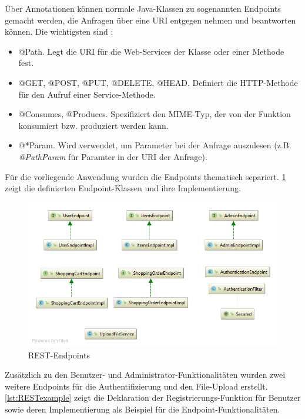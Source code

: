 Über Annotationen können normale Java-Klassen zu sogenannten Endpoints gemacht werden, die Anfragen über eine \acs{URI} entgegen nehmen und beantworten können.
Die wichtigsten sind \cite{Jersey2017a}:

\begin{itemize}
\item{@Path.} Legt die \acs{URI} für die Web-Services der Klasse oder einer Methode fest.
\item{@GET, @POST, @PUT, @DELETE, @HEAD.} Definiert die \acs{HTTP}-Methode für den Aufruf einer Service-Methode.
\item{@Consumes, @Produces.} Spezifiziert den \acs{MIME}-Typ, der von der Funktion konsumiert bzw. produziert werden kann.
\item{@*Param.} Wird verwendet, um Parameter bei der Anfrage auszulesen (z.B. \textit{@PathParam} für Paramter in der \acs{URI} der Anfrage).
\end{itemize}

Für die vorliegende Anwendung wurden die Endpoints thematisch separiert.
\cref{fig:endpoints} zeigt die definierten Endpoint-Klassen und ihre Implementierung.

\begin{figure}[th!]
	\centering
	\includegraphics[width=0.75\linewidth]{bilder/kap7/api_diagram}
	\caption{REST-Endpoints}
	\label{fig:endpoints}
\end{figure}

Zusätzlich zu den Benutzer- und Administrator-Funktionalitäten wurden zwei weitere Endpoints für die Authentifizierung und den File-Upload erstellt.
\\


\cref{lst:RESTexample} zeigt die Deklaration der Registrierungs-Funktion für Benutzer sowie deren Implementierung als Beispiel für die Endpoint-Funktionalitäten.

